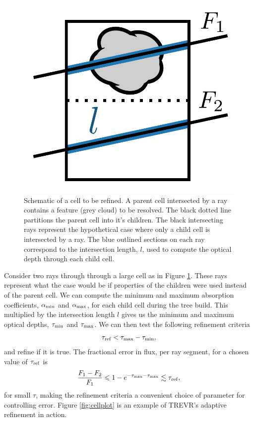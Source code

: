 \documentclass[fleq,usenatbib]{mnras}
\newcommand{\acro}{TREVR}
\newcommand{\tr}{\tau_{\rm ref}}
\begin{document}
\begin{figure}
\includegraphics[width=1\linewidth]{Figures/refine.pdf}
\caption{Schematic of a cell to be refined. A parent cell intersected by a ray 
contains a feature (grey cloud) to be resolved. The black dotted line 
partitions the parent cell into it's children. The black intersecting rays 
represent the hypothetical case where only a child cell is intersected by a 
ray. The blue outlined sections on each ray correspond to the intersection 
length, $l$,  used to compute the optical depth through each child cell.}
\label{fig:refine}
\end{figure}
Consider two rays through through a large cell as in Figure \ref{fig:refine}. 
These rays represent what the case would be if properties of the children were 
used instead of the parent cell. We can compute the minimum and maximum 
absorption coefficients, $\alpha_{\rm min}$ and $\alpha_{\rm max}$, for each 
child cell during the tree build. This multiplied by the intersection length 
$l$ gives us the minimum and maximum optical depths, $\tau_{\rm min}$ and 
$\tau_{\rm max}$. We can then test the following refinement criteria
\begin{equation}
\label{eqn:refcrit}
\tr < \tau_{\rm max} - \tau_{\rm min},
\end{equation}
and refine if it is true. The fractional error in flux, per ray segment, for a 
chosen value of $\tr$ is
\begin{equation}
\label{eqn:reffrac}
\frac{F_1 - F_2}{F_1} \leq 1 - e^{-\tau_{\rm max}-\tau_{\rm max}} 
\lesssim \tr,
\end{equation}
for small $\tau$, making the refinement criteria a convenient choice of 
parameter for controlling error. Figure \ref{fig:cellplot} is an example of 
\acro{}'s adaptive refinement in action.
\end{document}
